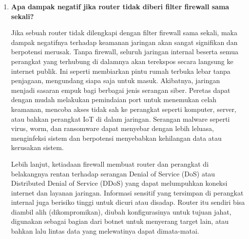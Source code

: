 \begin{enumerate}
    \item \textbf{Apa dampak negatif jika router tidak diberi filter firewall sama sekali?}
    
    Jika sebuah router tidak dilengkapi dengan filter firewall sama sekali, maka dampak negatifnya terhadap keamanan jaringan akan sangat signifikan dan berpotensi merusak. Tanpa firewall, seluruh jaringan internal beserta semua perangkat yang terhubung di dalamnya akan terekspos secara langsung ke internet publik. Ini seperti membiarkan pintu rumah terbuka lebar tanpa penjagaan, mengundang siapa saja untuk masuk. Akibatnya, jaringan menjadi sasaran empuk bagi berbagai jenis serangan siber. Peretas dapat dengan mudah melakukan pemindaian port untuk menemukan celah keamanan, mencoba akses tidak sah ke perangkat seperti komputer, server, atau bahkan perangkat IoT di dalam jaringan. Serangan malware seperti virus, worm, dan ransomware dapat menyebar dengan lebih leluasa, menginfeksi sistem dan berpotensi menyebabkan kehilangan data atau kerusakan sistem.

    Lebih lanjut, ketiadaan firewall membuat router dan perangkat di belakangnya rentan terhadap serangan Denial of Service (DoS) atau Distributed Denial of Service (DDoS) yang dapat melumpuhkan koneksi internet dan layanan jaringan. Informasi sensitif yang tersimpan di perangkat internal juga berisiko tinggi untuk dicuri atau disadap. Router itu sendiri bisa diambil alih (dikompromikan), diubah konfigurasinya untuk tujuan jahat, digunakan sebagai bagian dari botnet untuk menyerang target lain, atau bahkan lalu lintas data yang melewatinya dapat dimata-matai.
    
\end{enumerate}